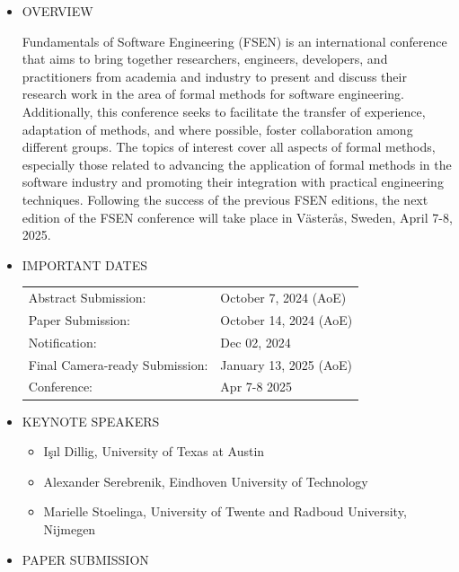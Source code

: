 \documentclass[prodmode,acmtecs]{acmsmall} %
\begin{document}
\begin{itemize}\item  OVERVIEW  
 
  Fundamentals of Software Engineering (FSEN) is an international conference that aims to bring together researchers, engineers, developers, and practitioners from academia and industry to present and discuss their research work in the area of formal methods for software engineering. Additionally, this conference seeks to facilitate the transfer of experience, adaptation of methods, and where possible, foster collaboration among different groups. The topics of interest cover all aspects of formal methods, especially those related to advancing the application of formal methods in the software industry and promoting their integration with practical engineering techniques. Following the success of the previous FSEN editions, the next edition of the FSEN conference will take place in Västerås, Sweden, April 7-8, 2025. 
 
\item  IMPORTANT DATES  
 
\begin{tabulary}{\linewidth}{LL}Abstract Submission:  & October 7, 2024 (AoE) \\
Paper Submission:  & October 14, 2024 (AoE) \\
Notification:  & Dec 02, 2024 \\
Final Camera-ready Submission:  & January 13, 2025 (AoE) \\
Conference:  & Apr 7-8 2025 \\
\end{tabulary}
 
\item  KEYNOTE SPEAKERS  
 
\begin{itemize}\item  Işıl Dillig, University of Texas at Austin
\item  Alexander Serebrenik, Eindhoven University of Technology
\item  Marielle Stoelinga, University of Twente and Radboud University, Nijmegen
\end{itemize} 
\item  PAPER SUBMISSION 
 

\end{itemize}
\end{document}
